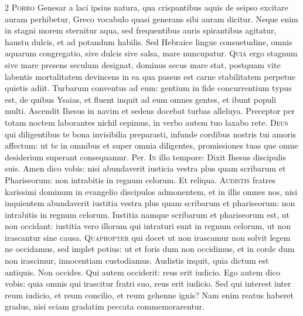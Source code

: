 \begin{multicols*}{2}
\lettrine[lines=2]{\zallmancaps \color{Blue} P}{orro} Genesar a laci ipsius natura, qua crispantibus aquis de seipso excitare auram perhibetur, Greco vocabulo quasi generans sibi auram dicitur. Neque enim in stagni morem sternitur aqua, sed frequentibus auris spirantibus agitatur, haustu dulcis, et ad potandum habilis. Sed Hebraice lingue consuetudine, omnis aquarum congregatio, sive dulcis sive salsa, mare nuncupatur.
\lettrine[lines=2]{\zallmancaps \color{Red} Q}{uia} ergo stagnum sive mare presens seculum designat, dominus secus mare stat, postquam vite labentis mortalitatem devincens in ea qua passus est carne stabilitatem perpetue quietis adiit. Turbarum conventus ad eum: gentium in fide concurrentium typus est, de quibus Ysaias, et fluent inquit ad eum omnes gentes, et ibunt populi multi.
 Ascendit Ihesus in navim et sedens docebat turbas alleluya.
 Preceptor per totam noctem laborantes nichil cepimus, in verbo autem tuo laxabo rete.
\lettrine[lines=2]{\zallmancaps \color{Blue} D}{eus} qui diligentibus te bona invisibilia preparasti, infunde cordibus nostris tui amoris affectum: ut te in omnibus et super omnia diligentes, promissiones tuas que omne desiderium superant consequamur. Per.
\lettrine[lines=2]{\zallmancaps \color{Red} I}{n} illo tempore: Dixit Ihesus discipulis suis. Amen dico vobis: nisi abundaverit iusticia vestra plus quam scribarum et Phariseorum: non intrabitis in regnum celorum. Et reliqua.
 \grecross
\lettrine[lines=2]{\zallmancaps \color{Blue} A}{udistis} fratres karissimi dominum in evangelio discipulos admonentem, et in illis omnes nos, nisi inquientem abundaverit iustitia vestra plus quam scribarum et phariseorum: non intrabitis in regnum celorum. Iustitia namque scribarum et phariseorum est, ut non occidant: iustitia vero illorum qui intraturi sunt in regnum celorum, ut non irascantur sine causa.
\lettrine[lines=2]{\zallmancaps \color{Red} Q}{uapropter} qui docet ut non irascamur non solvit legem ne occidamus, sed implet potius: ut et foris dum non occidimus, et in corde dum non irascimur, innocentiam custodiamus. Audistis inquit, quia dictum est antiquis. Non occides. Qui autem occiderit: reus erit iudicio. Ego autem dico vobis: quia omnis qui irascitur fratri suo, reus erit iudicio. Sed qui interest inter reum iudicio, et reum concilio, et reum gehenne ignis? Nam enim reatus haberet gradus, nisi eciam gradatim peccata commemorarentur.

\end{multicols*}
